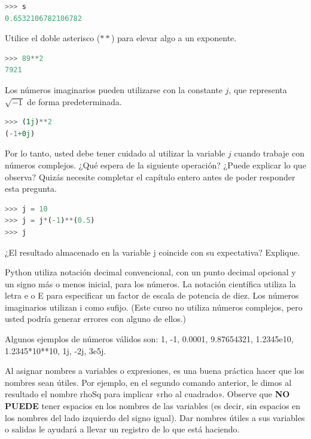 \begin{lstlisting}[language=Python]
>>> s
0.6532106782106782
\end{lstlisting}

Utilice el doble asterisco ($**$) para elevar algo a un exponente.

\begin{lstlisting}[language=Python]
>>> 89**2
7921
\end{lstlisting}

Los números imaginarios pueden utilizarse con la constante $j$, que representa $\sqrt{-1}$ de forma predeterminada.

\begin{lstlisting}[language=Python]
>>> (1j)**2
(-1+0j)
\end{lstlisting}

Por lo tanto, usted debe tener cuidado al utilizar la variable $j$ cuando trabaje con números complejos. ¿Qué espera de la siguiente operación? ¿Puede explicar lo que observa? Quizás necesite completar el capítulo entero antes de poder responder esta pregunta. \QA

\begin{lstlisting}[language=Python]
>>> j = 10
>>> j = j*(-1)**(0.5)
>>> j
\end{lstlisting}

¿El resultado almacenado en la variable {\s j} coincide con su expectativa? Explique. \QA

Python utiliza notación decimal convencional, con un punto decimal opcional y un signo más o menos inicial, para los números. La notación científica utiliza la letra e o E para especificar un factor de escala de potencia de diez. Los números imaginarios utilizan i como sufijo. (Este curso no utiliza números complejos, pero usted podría generar errores con alguno de ellos.)

Algunos ejemplos de números válidos son: 1, -1, 0.0001, 9.87654321, 1.2345e10, 1.2345*10**10, 1j, -2j, 3e5j.

Al asignar nombres a variables o expresiones, es una buena práctica hacer que los nombres sean útiles. Por ejemplo, en el segundo comando anterior, le dimos al resultado el nombre rhoSq para implicar «rho al cuadrado». Observe que {\bf NO PUEDE} tener espacios en los nombres de las variables (es decir, sin espacios en los nombres del lado izquierdo del signo igual). Dar nombres útiles a sus variables o salidas le ayudará a llevar un registro de lo que está haciendo.


